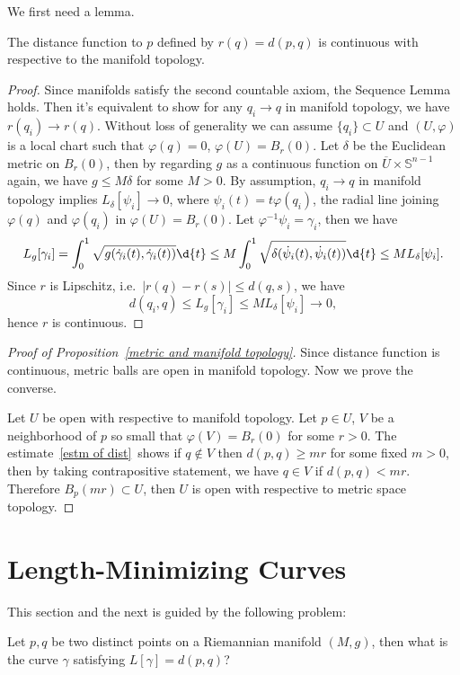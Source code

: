 We first need a lemma.
\begin{lem}
    The distance function to $p$ defined by $r(q)=d(p,q)$ is continuous with respective to the manifold topology.
\end{lem}
\begin{proof}
    Since manifolds satisfy the second countable axiom, the Sequence Lemma holds.
    Then it's equivalent to show for any $q_i\to q$ in manifold topology, we have $r(q_i)\to r(q)$.
    Without loss of generality we can assume $\{q_i\}\subset U$ and $(U,\varphi)$ is a local chart such that $\varphi(q)=0$, $\varphi(U)=B_r(0)$.
    Let $\delta$ be the Euclidean metric on $B_r(0)$, then by regarding $g$ as a continuous function on $\overline{U}\times\mathbb{S}^{n-1}$ again, we have $g\leq M\delta$ for some $M>0$.
    By assumption, $q_i\to q$ in manifold topology implies $L_\delta[\psi_i]\to 0$, where $\psi_i(t)=t\varphi(q_i)$, the radial line joining $\varphi(q)$ and $\varphi(q_i)$ in $\varphi(U)=B_r(0)$.
    Let $\varphi^{-1}\psi_i=\gamma_i$, then we have
    \[L_g[\gamma_i]=\int_0^1\sqrt{g(\dot\gamma_i(t),\dot\gamma_i(t))}\d{t}\leq M\int_0^1\sqrt{\delta(\dot\psi_i(t),\dot\psi_i(t))}\d{t}\leq ML_\delta[\psi_i].\]
    Since $r$ is Lipschitz, i.e.\ $|r(q)-r(s)|\leq d(q,s)$, we have
    \[d(q_i,q)\leq L_g[\gamma_i]\leq ML_\delta[\psi_i]\to 0,\]
    hence $r$ is continuous.
\end{proof}

\begin{proof}[Proof of Proposition~\ref{metric and manifold topology}]
    Since distance function is continuous, metric balls are open in manifold topology.
    Now we prove the converse.

    Let $U$ be open with respective to manifold topology.
    Let $p\in U$, $V$ be a neighborhood of $p$ so small that $\varphi(V)=B_r(0)$ for some $r>0$.
    The estimate~\eqref{estm of dist}~shows if $q\notin V$ then $d(p,q)\geq mr$ for some fixed $m>0$, then by taking contrapositive statement, we have $q\in V$ if $d(p,q)<mr$.
    Therefore $B_p(mr)\subset U$, then $U$ is open with respective to metric space topology.
\end{proof}

\section{Length-Minimizing Curves}

This section and the next is guided by the following problem:
\begin{pro}
    Let $p,q$ be two distinct points on a Riemannian manifold $(M,g)$, then what is the curve $\gamma$ satisfying $L[\gamma]=d(p,q)$?
\end{pro}

